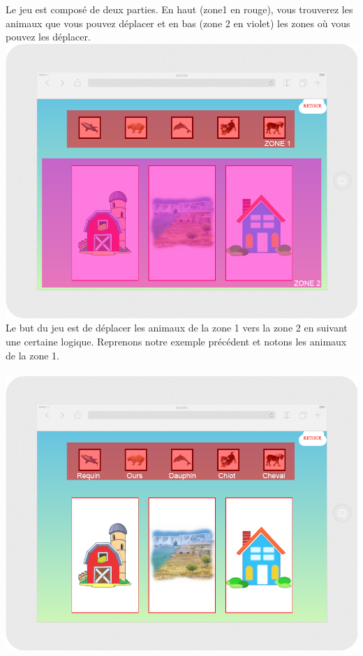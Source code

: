 \documentclass{article}
\begin{document}
Le jeu est composé de deux parties. En haut (zone1 en rouge), vous trouverez les animaux que vous pouvez déplacer et en bas (zone 2 en violet) les zones où vous pouvez les déplacer.
\vspace{0.5cm}\\
\includegraphics[width=1.0\textwidth]{zone}
\vspace{0.5cm}\\
Le but du jeu est de déplacer les animaux de la zone 1 vers la zone 2 en suivant une certaine logique. Reprenons notre exemple précédent et notons les animaux de la zone 1.\\
\vspace{0.5cm}\\
\includegraphics[width=1.0\textwidth]{zone1}
\end{document}
